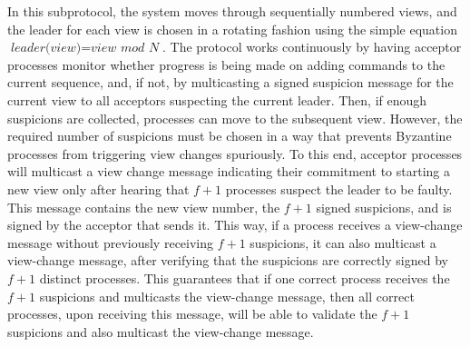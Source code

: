 In this subprotocol, the system moves through sequentially numbered views, and the leader for each view is chosen in a rotating fashion using the simple equation $\textit{leader(view)}=\textit{view mod N}$. The protocol works continuously by having acceptor processes monitor whether progress is being made on adding commands to the current sequence, and, if not, by multicasting a signed {\sc suspicion} message for the current view to all acceptors suspecting the current leader. Then, if enough suspicions are collected, processes can move to the subsequent view. However, the required number of suspicions must be chosen in a way that prevents Byzantine processes from triggering view changes spuriously. To this end, acceptor processes will multicast a view change message indicating their commitment to starting a new view only after hearing that $f+1$ processes suspect the leader to be faulty. This message contains the new view number, the $f+1$ signed suspicions, and is signed by the acceptor that sends it. This way, if a process receives a view-change message without previously receiving $f+1$ suspicions, it can also multicast a view-change message, after verifying that the suspicions are correctly signed by $f+1$ distinct processes.
This guarantees that if one correct process receives the $f+1$ suspicions and multicasts the view-change message, then all correct processes, upon receiving this message, will be able to validate the $f+1$ suspicions and also multicast the view-change message.\par

